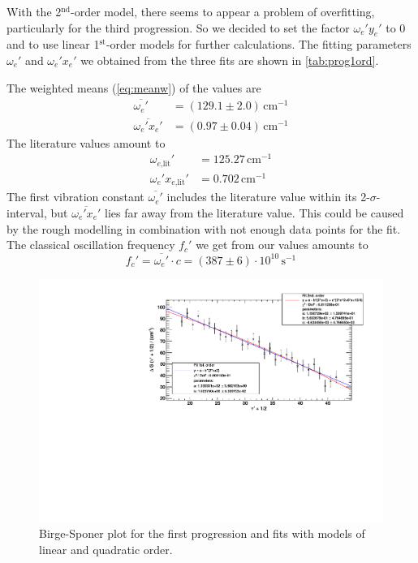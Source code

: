 With the 2$^\text{nd}$-order model, there seems to appear a problem of overfitting,
particularly for the third progression.
So we decided to set the factor $\omega_e' y_e'$ to 0 and to use linear 1$^\text{st}$-order models
for further calculations.
The fitting parameters $\omega_e'$ and $\omega_e' x_e'$ we obtained from the three fits
are shown in \autoref{tab:prog1ord}.

The weighted means (\autoref{eq:meanw}) of the values are
\begin{equation}
\label{eq:exstatevibconsts}
\begin{split}
    \overline{\omega_e'}		&   = (129.1 \pm 2.0)\,\text{cm}^{-1}\\
    \overline{\omega_e' x_e'} 	&	= (0.97 \pm 0.04)\,\text{cm}^{-1}
  \end{split}
\end{equation}
The literature values \cite{steinfeld} amount to
\begin{equation}
\begin{split}
    \omega_{e\text{,lit}}'			&   = 125.27\,\text{cm}^{-1}\\
    \omega_e' x_{e\text{,lit}}' 	&	= 0.702\,\text{cm}^{-1}
  \end{split}
\end{equation}
The first vibration constant $\overline{\omega_e'}$ includes the literature value within its 2-$\sigma$-interval, but
$\overline{\omega_e' x_e'}$ lies far away from the literature value. This could be caused by the rough
modelling in combination with not enough data points for the fit.\\
The classical oscillation frequency $f_c'$ we get from our values amounts to
\begin{equation}
  f_c'= \overline{\omega_e'} \cdot c = (387 \pm 6 ) \cdot 10^{10}\, \text{s}^{-1}
\end{equation}


\begin{figure}[H]
\begin{center}
  \includegraphics[width=\textwidth]{../img/prog1_birgesponer.pdf}
  \caption[---]{Birge-Sponer plot for the first progression and fits with models of linear and quadratic order.}
  \label{img:prog1}
\end{center}
\end{figure}


